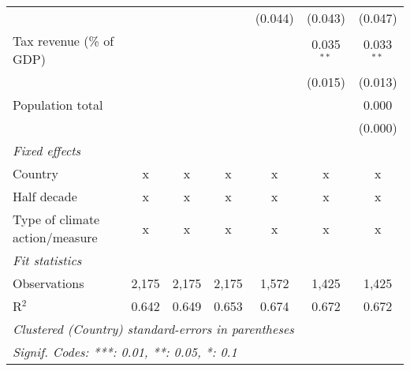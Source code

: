 \begin{tabular}{lcccccc}
                                                         &         &                &                & (0.044)        & (0.043)        & (0.047)\\   
   Tax revenue (\% of GDP)                               &         &                &                &                & 0.035$^{**}$   & 0.033$^{**}$\\   
                                                         &         &                &                &                & (0.015)        & (0.013)\\   
   Population total                                      &         &                &                &                &                & 0.000\\   
                                                         &         &                &                &                &                & (0.000)\\   
   \emph{Fixed effects}\\
   Country                                               & x       & x              & x              & x              & x              & x\\  
   Half decade                                           & x       & x              & x              & x              & x              & x\\  
   Type of climate action/measure                        & x       & x              & x              & x              & x              & x\\  
   \midrule \emph{Fit statistics}\\
   Observations                                          & 2,175   & 2,175          & 2,175          & 1,572          & 1,425          & 1,425\\  
   R$^2$                                                 & 0.642   & 0.649          & 0.653          & 0.674          & 0.672          & 0.672\\  
   \midrule
   \multicolumn{7}{l}{\emph{Clustered (Country) standard-errors in parentheses}}\\
   \multicolumn{7}{l}{\emph{Signif. Codes: ***: 0.01, **: 0.05, *: 0.1}}\\
\end{tabular}
\par\endgroup


